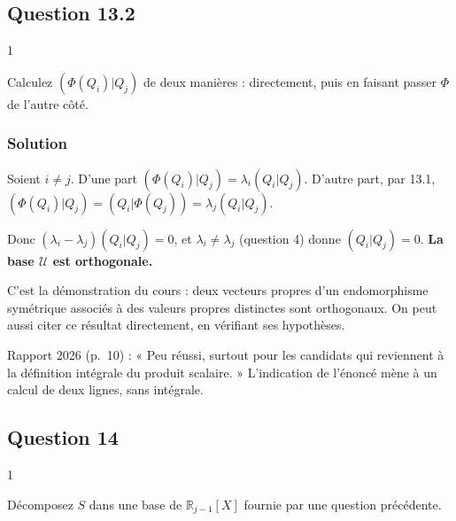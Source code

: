 \documentclass[11pt,a4paper]{article}
\begin{document}
\hypertarget{question-13.2}{%
\subsection{Question 13.2}\label{question-13.2}}

\begin{indication}{1}

Calculez \((\Phi(Q_i)|Q_j)\) de deux manières : directement, puis en faisant passer \(\Phi\) de l'autre côté.

\end{indication}

\hypertarget{solution-34}{%
\subsubsection{Solution}\label{solution-34}}

Soient \(i\neq j\). D'une part \((\Phi(Q_i)|Q_j)=\lambda_i(Q_i|Q_j)\). D'autre part, par 13.1, \((\Phi(Q_i)|Q_j)=(Q_i|\Phi(Q_j))=\lambda_j(Q_i|Q_j)\).

Donc \((\lambda_i-\lambda_j)(Q_i|Q_j)=0\), et \(\lambda_i\neq\lambda_j\) (question 4) donne \((Q_i|Q_j)=0\). \textbf{La base \(\mathcal U\) est orthogonale.}

\begin{methode}

C'est la démonstration du cours : deux vecteurs propres d'un endomorphisme symétrique associés à des valeurs propres distinctes sont orthogonaux. On peut aussi citer ce résultat directement, en vérifiant ses hypothèses.

\end{methode}

\begin{jury}

Rapport 2026 (p.~10) : « Peu réussi, surtout pour les candidats qui reviennent à la définition intégrale du produit scalaire. » L'indication de l'énoncé mène à un calcul de deux lignes, sans intégrale.

\end{jury}

\hypertarget{question-14}{%
\subsection{Question 14}\label{question-14}}

\begin{indication}{1}

Décomposez \(S\) dans une base de \(\mathbb R_{j-1}[X]\) fournie par une question précédente.

\end{indication}
\end{document}
